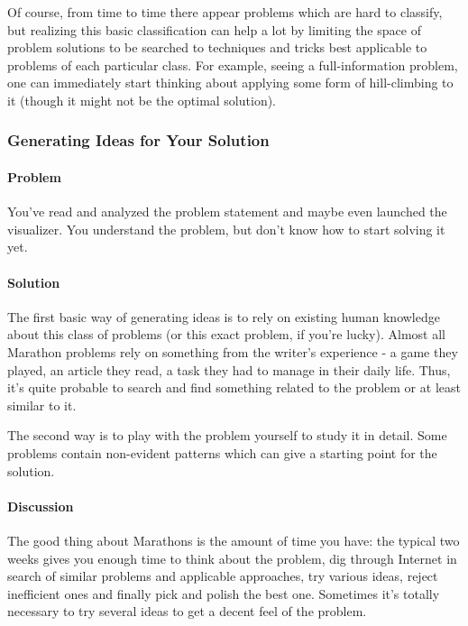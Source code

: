 Of course, from time to time there appear problems which are hard to
classify, but realizing this basic classification can help a lot by
limiting the space of problem solutions to be searched to techniques and
tricks best applicable to problems of each particular class. For
example, seeing a full-information problem, one can immediately start
thinking about applying some form of hill-climbing to it (though it
might not be the optimal solution).

\hypertarget{generating-ideas-for-your-solution}{%
\subsubsection{Generating Ideas for Your
Solution}\label{generating-ideas-for-your-solution}}

\hypertarget{problem-1}{%
\paragraph{Problem}\label{problem-1}}

You've read and analyzed the problem statement and maybe even launched
the visualizer. You understand the problem, but don't know how to start
solving it yet.

\hypertarget{solution}{%
\paragraph{Solution}\label{solution}}

The first basic way of generating ideas is to rely on existing human
knowledge about this class of problems (or this exact problem, if you're
lucky). Almost all Marathon problems rely on something from the writer's
experience - a game they played, an article they read, a task they had
to manage in their daily life. Thus, it's quite probable to search and
find something related to the problem or at least similar to it.

The second way is to play with the problem yourself to study it in
detail. Some problems contain non-evident patterns which can give a
starting point for the solution.

\hypertarget{discussion}{%
\paragraph{Discussion}\label{discussion}}

The good thing about Marathons is the amount of time you have: the
typical two weeks gives you enough time to think about the problem, dig
through Internet in search of similar problems and applicable
approaches, try various ideas, reject inefficient ones and finally pick
and polish the best one. Sometimes it's totally necessary to try several
ideas to get a decent feel of the problem.

